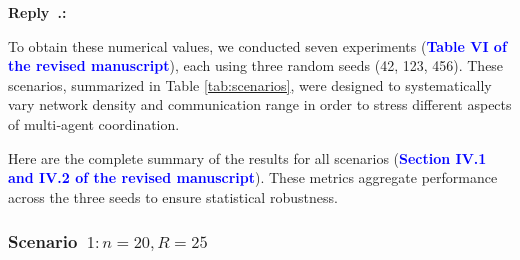 \documentclass[11pt]{article}
\newcounter{reviewer}
\newcounter{replyctr}[reviewer]
\renewcommand{\thereplyctr}{\thereviewer.\arabic{replyctr}}
\newenvironment{reply}
  {\refstepcounter{replyctr}%
   \addtocounter{replyctr}{-1}%
   \medskip\noindent
   \begin{sf}\textbf{Reply~\thereplyctr:}\ }
  {\addtocounter{replyctr}{1}%
   \medskip\end{sf}}
\begin{document}
\begin{refsection}
\begin{mdframed}[style=Resp]
\begin{reply}
\begin{abstract}
\medskip
\noindent\textbf{Keywords:} wireless sensor networks, multi-agent reinforcement learning, graph neural networks, policy fusion, energy-efficient routing, disaster monitoring, QMIX, QTRAN, scalability, green AI.
\end{abstract}


To obtain these numerical values, we conducted seven experiments (\textbf{\textcolor{blue}{Table VI of the revised manuscript}}), each using three random seeds (42, 123, 456). These scenarios, summarized in Table \ref{tab:scenarios}, were designed to systematically vary network density and communication range in order to stress different aspects of multi‑agent coordination.



\begin{center}
\label{tab:scenarios}
\end{center}

Here are the complete summary of the results for all scenarios (\textbf{\textcolor{blue}{Section IV.1 and IV.2 of the revised manuscript}}). These metrics aggregate performance across the three seeds to ensure statistical robustness.

\subsubsection{Scenario~$1: n = 20, R = 25$}
\label{sec:results_n20_r25}


\end{reply}
\end{mdframed}
\end{refsection}
\end{document}
